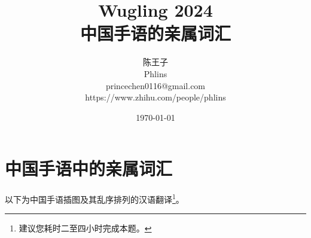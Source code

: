 \documentclass[12pt, a4paper, oneside]{ctexart}
\title{\textbf{Wugling 2024\\中国手语的亲属词汇}}
\author{陈王子\\Phlins\\princechen0116@gmail.com\\https://www.zhihu.com/people/phlins}
\date{\today}
\begin{document}
\maketitle

\setcounter{page}{0}
\maketitle
\thispagestyle{empty}
\newpage
\tableofcontents
\listoffigures
\newpage


\section{中国手语中的亲属词汇}

以下为中国手语插图及其乱序排列的汉语翻译\footnote{建议您耗时二至四小时完成本题。}。
\end{document}
